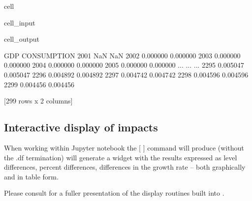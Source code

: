 \documentclass[letterpaper,10pt,english]{jupyterBook}
\begin{document}
\begin{sphinxuseclass}{cell}\begin{sphinxVerbatimInput}

\begin{sphinxuseclass}{cell_input}
\begin{sphinxVerbatim}[commandchars=\\\{\}]
\PYG{p}{[}\PYG{p}{]}
\end{sphinxVerbatim}

\end{sphinxuseclass}\end{sphinxVerbatimInput}
\begin{sphinxVerbatimOutput}

\begin{sphinxuseclass}{cell_output}
\begin{sphinxVerbatim}[commandchars=\\\{\}]
           GDP  CONSUMPTION
2001       NaN          NaN
2002  0.000000     0.000000
2003  0.000000     0.000000
2004  0.000000     0.000000
2005  0.000000     0.000000
...        ...          ...
2295  0.005047     0.005047
2296  0.004892     0.004892
2297  0.004742     0.004742
2298  0.004596     0.004596
2299  0.004456     0.004456

[299 rows x 2 columns]
\end{sphinxVerbatim}

\end{sphinxuseclass}\end{sphinxVerbatimOutput}

\end{sphinxuseclass}

\subsection{Interactive display of impacts}
\label{\detokenize{content/03_Installation/TestingModelFlow:interactive-display-of-impacts}}
\sphinxAtStartPar
When working within Jupyter notebook the {[} {]}  command will produce (without the .df termination) will generate a widget with the results expressed as level differences, percent differences, differences in the growth rate – both graphically and in table form.

\sphinxAtStartPar
Please consult  for a fuller presentation of the display routines built into .
\end{document}
